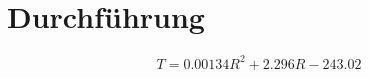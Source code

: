 \section{Durchführung}
\label{sec:Durchführung}

\begin{equation}
    T = 0.00134 R^2 + 2.296 R - 243.02
    \label{eqn:Temp}
\end{equation}